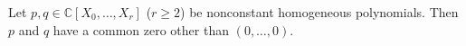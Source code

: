 Let $p, q \in \mathbb{C}[X_0, \ldots, X_r]$ ($r \geqslant 2$) be nonconstant homogeneous polynomials. Then $p$ and $q$ have a common zero other than $(0, \ldots, 0)$.
